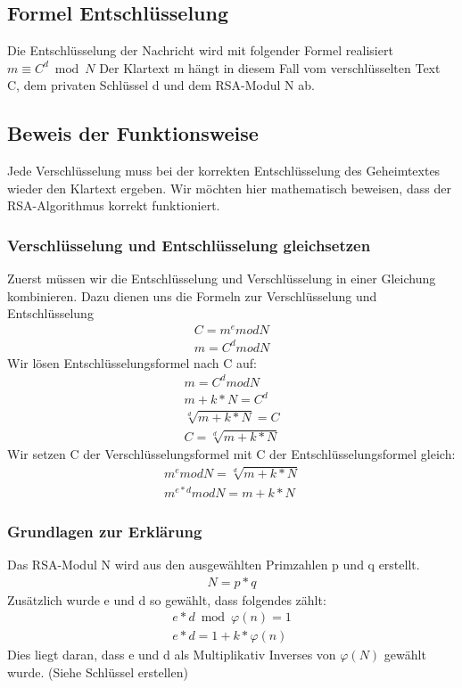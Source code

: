 \subsection{Formel Entschlüsselung}
Die Entschlüsselung der Nachricht wird mit folgender Formel realisiert
%
$ m \equiv C^d \bmod N $
%
Der Klartext m hängt in diesem Fall vom verschlüsselten Text C, dem privaten Schlüssel d und dem RSA-Modul N ab. 
%
\subsection{Beweis der Funktionsweise}
Jede Verschlüsselung muss bei der korrekten Entschlüsselung des Geheimtextes wieder den Klartext ergeben. Wir möchten hier mathematisch beweisen, dass der RSA-Algorithmus korrekt funktioniert.\\

\subsubsection{Verschlüsselung und Entschlüsselung gleichsetzen}
Zuerst müssen wir die Entschlüsselung und Verschlüsselung in einer Gleichung kombinieren. Dazu dienen uns die Formeln zur Verschlüsselung und Entschlüsselung\\
\begin{align}
  C = m^e mod N \\
  m = C^d mod N
\end{align}
Wir lösen Entschlüsselungsformel nach C auf:
\begin{align}
  m = C^d mod N \\
  m + k * N = C^d \\
  \sqrt[d]{m+k*N} = C \\
  C = \sqrt[d]{m+k*N}
\end{align}
Wir setzen C der Verschlüsselungsformel mit C der Entschlüsselungsformel gleich:
\begin{align}
  m^e mod N = \sqrt[d]{m+k*N}\\
  m^{e*d} mod N = m + k * N
\end{align}

\subsubsection{Grundlagen zur Erklärung}
Das RSA-Modul N wird aus den ausgewählten Primzahlen p und q erstellt.
\begin{align}
  N = p * q
\end{align}
Zusätzlich wurde e und d so gewählt, dass folgendes zählt:
\begin{align}
 e * d \bmod \varphi(n) = 1\\
 e * d = 1 + k * \varphi(n)
\end{align}
Dies liegt daran, dass e und d als Multiplikativ Inverses von $ \varphi(N) $ gewählt wurde. (Siehe Schlüssel erstellen) \\%

